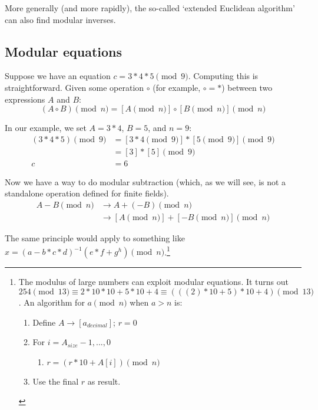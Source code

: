 More generally (and more rapidly), the so-called `extended Euclidean algorithm' \cite{extended-euclidean-algorithm} can also find modular inverses.


\subsection{Modular equations}
\label{subsec:modular-equations}

Suppose we have an equation $c = 3*4*5 \pmod 9$. Computing this is straightforward. Given some operation $\circ$ (for example, $\circ = *$) between two expressions $A$ and $B$:\vspace{.175cm}
\[(A \circ B)\pmod{n} = {[A\pmod {n}] \circ [B\pmod{n}]}\pmod{n}\]

In our example, we set $A = 3*4$, $B = 5$, and $n = 9$:\vspace{.175cm}
\begin{align*}
(3*4 * 5) \pmod{9} &= {[3*4 \pmod {9}] * [5 \pmod{9}]} \pmod{9} \\
				   &= [3]*[5] \pmod 9 \\
				 c &= 6
\end{align*}

Now we have a way to do modular subtraction (which, as we will see, is not a standalone operation defined for finite fields).\vspace{.175cm}
\begin{align*}
A - B \pmod n &\rightarrow A + (-B) \pmod n \\
			  &\rightarrow {[A \pmod {n}] + [-B \pmod{n}]} \pmod{n}
\end{align*}

The same principle would apply to something like $x = (a-b*c*d)^{-1} (e*f+g^{h}) \pmod n$.\footnote{The modulus of large numbers can exploit modular equations. It turns out $254 \pmod {13} \equiv 2*10*10 + 5*10 + 4 \equiv (((2)*10 + 5)*10 + 4) \pmod {13}$. An algorithm for $a \pmod n$ when $a > n$ is:
\begin{enumerate}
	\item Define $A \rightarrow [a_{decimal}]$; $r = 0$
	\item For $i = A_{size} - 1,...,0$
	\begin{enumerate}
		\item $r = (r*10 + A[i]) \pmod n$
	\end{enumerate}
	\item Use the final $r$ as result.
\end{enumerate}}



